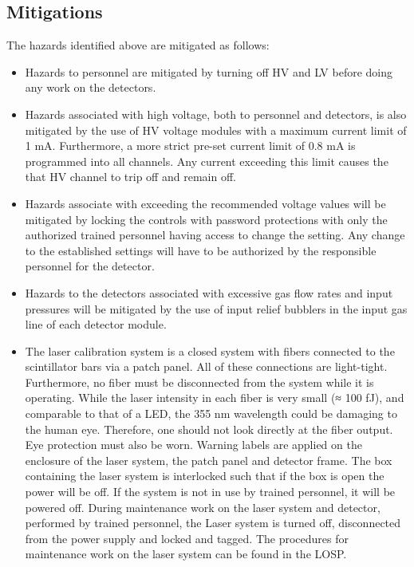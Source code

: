 \subsection{Mitigations}

The hazards identified above are mitigated as follows:
\begin{itemize}
\item  Hazards to personnel are mitigated by turning off HV and LV before doing any work on the detectors.
\item Hazards associated with high voltage, both to personnel and detectors, is also mitigated by the use of HV voltage modules with a maximum current limit of 1 mA. Furthermore, a more strict pre-set current limit of 0.8 mA is
programmed into all channels. Any current exceeding this limit causes the that HV channel to trip off and
remain off.
\item Hazards associate with exceeding the recommended voltage values will be mitigated by locking the controls
with password protections with only the authorized trained personnel having access to change the setting. Any
change to the established settings will have to be authorized by the responsible personnel for the detector.
\item Hazards to the detectors associated with excessive gas flow rates and input pressures will be mitigated by the use of input relief bubblers in the input gas line of each detector module.
\item The laser calibration system is a closed system with fibers connected to the
scintillator bars via a patch panel. All of these connections are light-tight.
Furthermore, no fiber must be disconnected from the system while it is
operating. While the laser intensity in each fiber is very small (≈ 100 fJ),
and comparable to that of a LED, the 355 nm wavelength could be damaging to the human eye. Therefore, one should not look directly at the fiber output.  Eye protection must also be worn.
Warning labels are applied on the enclosure of the laser system, the patch
panel and detector frame. The box containing the laser system is interlocked
such that if the box is open the power will be off. If the system is not in
use by trained personnel, it will be powered off. During maintenance work
on the laser system and detector, performed by trained personnel, the Laser
system is turned off, disconnected from the power supply and locked and
tagged. The procedures for maintenance work on the laser system can be
found in the LOSP.
\end{itemize}
